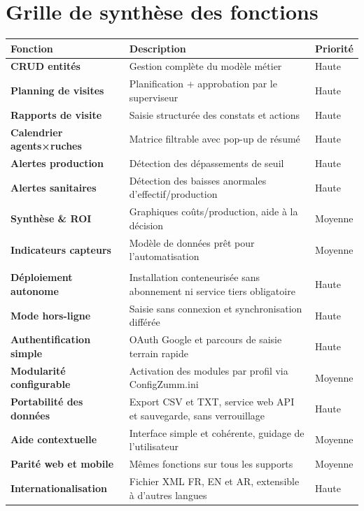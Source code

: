 \section{Grille de synthèse des fonctions}
\begin{xltabular}{\textwidth}{>{\bfseries}p{3.4cm} X C{2.2cm}}
\toprule
\textbf{Fonction} & \textbf{Description} & \textbf{Priorité} \\
\midrule
\endhead
CRUD entités        & Gestion complète du modèle métier                       & Haute \\
Planning de visites & Planification + approbation par le superviseur           & Haute \\
Rapports de visite  & Saisie structurée des constats et actions               & Haute \\
Calendrier agents×ruches & Matrice filtrable avec pop-up de résumé            & Haute \\
Alertes production  & Détection des dépassements de seuil                     & Haute \\
Alertes sanitaires  & Détection des baisses anormales d'effectif/production   & Haute \\
Synthèse \& ROI     & Graphiques coûts/production, aide à la décision         & Moyenne \\
Indicateurs capteurs & Modèle de données prêt pour l'automatisation            & Moyenne \\
\midrule
{} \\
\midrule
Déploiement autonome & Installation conteneurisée sans abonnement ni service tiers obligatoire & Haute \\
Mode hors-ligne & Saisie sans connexion et synchronisation différée & Haute \\
Authentification simple & OAuth Google et parcours de saisie terrain rapide & Haute \\
Modularité configurable & Activation des modules par profil via ConfigZumm.ini & Moyenne \\
Portabilité des données & Export CSV et TXT, service web API et sauvegarde, sans verrouillage & Haute \\
Aide contextuelle & Interface simple et cohérente, guidage de l'utilisateur & Moyenne \\
Parité web et mobile & Mêmes fonctions sur tous les supports & Moyenne \\
Internationalisation & Fichier XML FR, EN et AR, extensible à d'autres langues & Haute \\

\end{xltabular}
